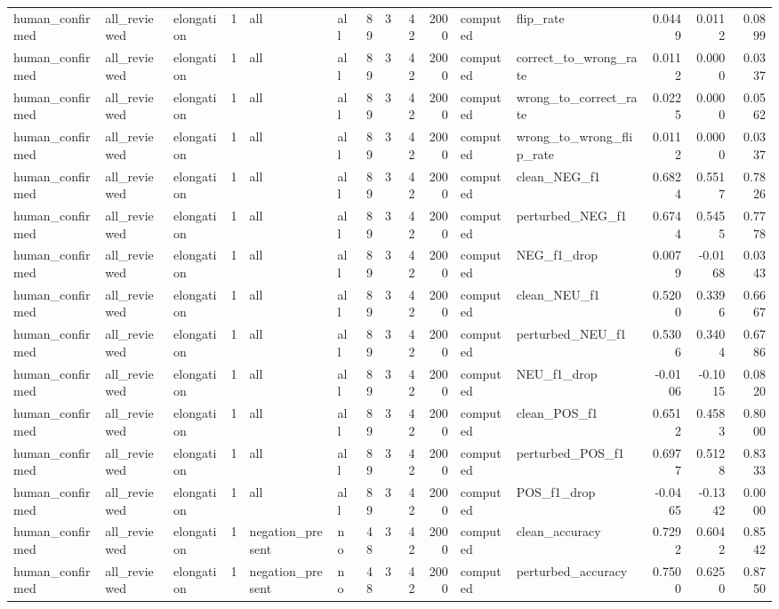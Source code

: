 \begin{tabular}{lllrllrrrrllrrr}
human_confirmed & all_reviewed & elongation & 1 & all & all & 89 & 3 & 42 & 2000 & computed & flip_rate & 0.0449 & 0.0112 & 0.0899 \\
human_confirmed & all_reviewed & elongation & 1 & all & all & 89 & 3 & 42 & 2000 & computed & correct_to_wrong_rate & 0.0112 & 0.0000 & 0.0337 \\
human_confirmed & all_reviewed & elongation & 1 & all & all & 89 & 3 & 42 & 2000 & computed & wrong_to_correct_rate & 0.0225 & 0.0000 & 0.0562 \\
human_confirmed & all_reviewed & elongation & 1 & all & all & 89 & 3 & 42 & 2000 & computed & wrong_to_wrong_flip_rate & 0.0112 & 0.0000 & 0.0337 \\
human_confirmed & all_reviewed & elongation & 1 & all & all & 89 & 3 & 42 & 2000 & computed & clean_NEG_f1 & 0.6824 & 0.5517 & 0.7826 \\
human_confirmed & all_reviewed & elongation & 1 & all & all & 89 & 3 & 42 & 2000 & computed & perturbed_NEG_f1 & 0.6744 & 0.5455 & 0.7778 \\
human_confirmed & all_reviewed & elongation & 1 & all & all & 89 & 3 & 42 & 2000 & computed & NEG_f1_drop & 0.0079 & -0.0168 & 0.0343 \\
human_confirmed & all_reviewed & elongation & 1 & all & all & 89 & 3 & 42 & 2000 & computed & clean_NEU_f1 & 0.5200 & 0.3396 & 0.6667 \\
human_confirmed & all_reviewed & elongation & 1 & all & all & 89 & 3 & 42 & 2000 & computed & perturbed_NEU_f1 & 0.5306 & 0.3404 & 0.6786 \\
human_confirmed & all_reviewed & elongation & 1 & all & all & 89 & 3 & 42 & 2000 & computed & NEU_f1_drop & -0.0106 & -0.1015 & 0.0820 \\
human_confirmed & all_reviewed & elongation & 1 & all & all & 89 & 3 & 42 & 2000 & computed & clean_POS_f1 & 0.6512 & 0.4583 & 0.8000 \\
human_confirmed & all_reviewed & elongation & 1 & all & all & 89 & 3 & 42 & 2000 & computed & perturbed_POS_f1 & 0.6977 & 0.5128 & 0.8333 \\
human_confirmed & all_reviewed & elongation & 1 & all & all & 89 & 3 & 42 & 2000 & computed & POS_f1_drop & -0.0465 & -0.1342 & 0.0000 \\
human_confirmed & all_reviewed & elongation & 1 & negation_present & no & 48 & 3 & 42 & 2000 & computed & clean_accuracy & 0.7292 & 0.6042 & 0.8542 \\
human_confirmed & all_reviewed & elongation & 1 & negation_present & no & 48 & 3 & 42 & 2000 & computed & perturbed_accuracy & 0.7500 & 0.6250 & 0.8750 \\

\end{tabular}

